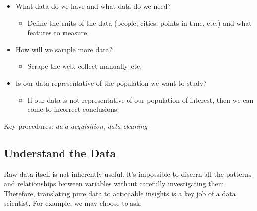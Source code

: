\documentclass[
  letterpaper,
  DIV=11,
  numbers=noendperiod]{scrreprt}
\providecommand{\tightlist}{%
  \setlength{\itemsep}{0pt}\setlength{\parskip}{0pt}}\usepackage{longtable,booktabs,array}
\begin{document}
\begin{itemize}
\tightlist
\item
  What data do we have and what data do we need?

  \begin{itemize}
  \tightlist
  \item
    Define the units of the data (people, cities, points in time, etc.)
    and what features to measure.
  \end{itemize}
\item
  How will we sample more data?

  \begin{itemize}
  \tightlist
  \item
    Scrape the web, collect manually, etc.
  \end{itemize}
\item
  Is our data representative of the population we want to study?

  \begin{itemize}
  \tightlist
  \item
    If our data is not representative of our population of interest,
    then we can come to incorrect conclusions.
  \end{itemize}
\end{itemize}

Key procedures: \emph{data acquisition}, \emph{data cleaning}

\hypertarget{understand-the-data}{%
\subsection{Understand the Data}\label{understand-the-data}}

Raw data itself is not inherently useful. It's impossible to discern all
the patterns and relationships between variables without carefully
investigating them. Therefore, translating pure data to actionable
insights is a key job of a data scientist. For example, we may choose to
ask:
\end{document}
